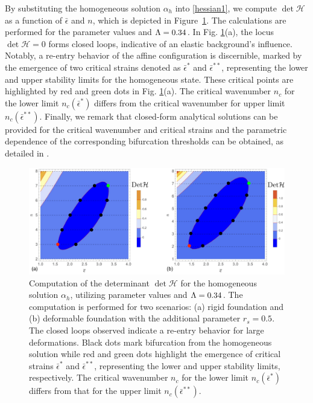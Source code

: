 % 
By substituting the homogeneous solution $\alpha_h$ into \eqref{hessian1}, we compute $\det \mathcal{H}$ as a function of $\bar \epsilon$ and $n$, which is depicted in Figure~\ref{fig:hessian1}. The calculations are performed for the parameter values  and $\Lambda=0.34$.
In Fig. \ref{fig:hessian1}(a), the locus $\det \mathcal H=0$ forms closed loops, indicative of an elastic background's influence. Notably, a re-entry behavior of the affine configuration is discernible, marked by the emergence of two critical strains denoted as $\bar\epsilon^*$ and $\bar\epsilon^{**}$, representing the lower and upper stability limits for the homogeneous state. These critical points are highlighted by red and green dots in Fig. \ref{fig:hessian1}(a). The critical wavenumber $n_c$ for the lower limit $n_c(\bar{\epsilon}^*)$    differs from the critical wavenumber for  upper limit $n_c(\bar{\epsilon}^{**})$. Finally, we remark that closed-form analytical solutions can be provided for the critical wavenumber and critical strains and the parametric dependence of the corresponding bifurcation thresholds can be obtained, as detailed in \cite{Salman2021-mn}.


\begin{figure}
     \centering
     \includegraphics[scale=0.25]{./final_images/fig1.pdf}
\caption{
Computation of the determinant $\det \mathcal{H}$ for the homogeneous solution $\alpha_h$, utilizing parameter values  and $\Lambda = 0.34$. The computation is performed for two scenarios: (a) rigid foundation and (b) deformable foundation with the additional parameter $r_s=0.5$. The closed loops observed indicate a re-entry behavior for large deformations. Black dots mark bifurcation from the homogeneous solution while red and green dots highlight the emergence of critical strains $\bar{\epsilon}^*$ and $\bar{\epsilon}^{**}$, representing the lower and upper stability limits, respectively. The critical wavenumber $n_c$ for the lower limit $n_c(\bar{\epsilon}^*)$ differs from that for the upper limit $n_c(\bar{\epsilon}^{**})$.}
     \label{fig:hessian1}
 \end{figure}

